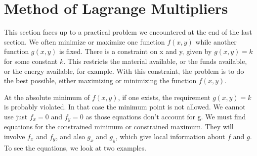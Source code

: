 \section{Method of Lagrange Multipliers}\label{sec:lagrange_multipliers}

This section faces up to a practical problem we encountered at the end of the last section. We often minimize or maximize one function $f(x, y)$ while another function $g(x, y)$ is fixed. There is a constraint on x and y, given by $g(x, y) = k$ for some constant $k$. This restricts the material available, or the funds available, or the energy available, for example. With this constraint, the problem is to do the best possible, either maximizing or minimizing the function $f(x,y)$.

At the absolute minimum of $f(x, y)$, if one exists, the requirement $g(x, y) = k$ is probably violated.
In that case the minimum point is not allowed. We cannot use just $f_x = 0$ and $f_y = 0$ as
those equations don't account for g. We must find equations for the constrained minimum or constrained maximum. They will involve $f_x$ and $f_y$, and also $g_x$ and $g_y$, which give local information about $f$ and $g$. To see the equations, we look at two examples.\\


